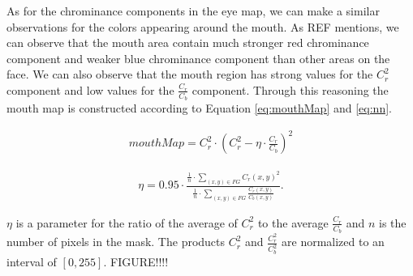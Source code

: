 
As for the chrominance components in the eye map, we can make a similar observations for the colors appearing around the mouth. As REF mentions, we can observe that the mouth area contain much stronger red chrominance component and weaker blue chrominance component than other areas on the face. We can also observe that the mouth region has strong values for the $C_r^2$ component and low values for the $\frac{C_r}{C_b}$ component. Through this reasoning the mouth map is constructed according to Equation \ref{eq:mouthMap} and \ref{eq:nn}.

\begin{equation} \label{eq:mouthMap}
\begin{split}
mouthMap = C_r^2 \cdot (C_r^2 - \eta \cdot \frac{C_r}{C_b})^2
\end{split}
\end{equation}




\begin{equation} \label{eq:nn}
\begin{split}
\eta = 0.95 \cdot \frac{\frac{1}{n} \cdot \sum\limits_{(x,y) \in FG} C_r(x,y)^2}{\frac{1}{n} \cdot \sum\limits_{(x,y) \in FG} \frac{C_r(x,y)}{C_b(x,y)}}.
\end{split}
\end{equation}


$\eta$ is a parameter for the ratio of the average of $C_r^2$ to the average $\frac{C_r}{C_b}$ and $n$ is the number of pixels in the mask. The products $C_r^2$ and $\frac{C_r^2}{C_b^2}$ are normalized to an interval of $[0,255]$. FIGURE!!!!

